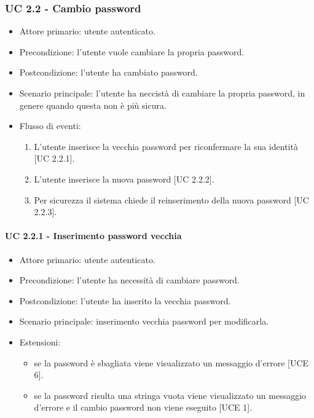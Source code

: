     \subsubsection{UC 2.2 - Cambio password}
        \begin{itemize}
            \item Attore primario: utente autenticato.
            \item Precondizione: l'utente vuole cambiare la propria password.
            \item Postcondizione: l'utente ha cambiato password.
            \item Scenario principale: l'utente ha neccistà di cambiare la propria password, in genere quando questa non è più sicura.
            \item Flusso di eventi:
                \begin{enumerate}
                    \item L'utente inserisce la vecchia password per riconfermare la sua identità [UC 2.2.1].
                    \item L'utente inserisce la nuova password [UC 2.2.2].
                    \item Per sicurezza il sistema chiede il reinserimento della nuova password [UC 2.2.3].
                \end{enumerate}
        \end{itemize}
        \paragraph{UC 2.2.1 - Inserimento password vecchia}
            \begin{itemize}
                \item Attore primario: utente autenticato.
                \item Precondizione: l'utente ha necessità di cambiare password.
                \item Postcondizione: l'utente ha inserito la vecchia password.
                \item Scenario principale: inserimento vecchia password per modificarla.
                \item Estensioni:
                    \begin{itemize}
                        \item se la password è sbagliata viene visualizzato un messaggio d'errore [UCE 6].
                        \item se la password risulta una stringa vuota viene visualizzato un messaggio d'errore e il cambio password non viene eseguito [UCE 1].
                    \end{itemize}
            \end{itemize}
